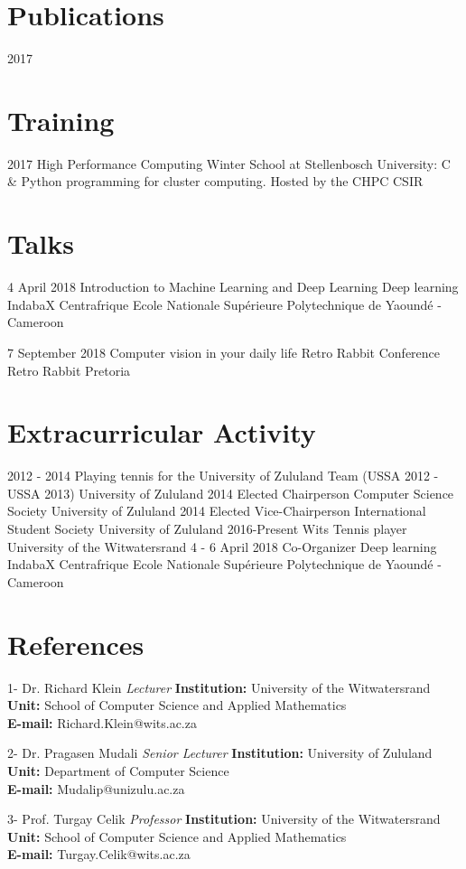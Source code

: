 \documentclass[letterpaper]{moderncv}        %
\begin{document}
	
\section{Publications}
\cventry
{2017}
{}
{}
{}
{}
{}

\section{Training}
\cventry
{2017}
{High Performance Computing Winter School at Stellenbosch University: C \& Python programming for cluster computing.}
{Hosted by the CHPC}
{CSIR}
{}
{}

\section{Talks}
\cventry
{4 April 2018}
{Introduction to Machine Learning and Deep Learning}
{Deep learning IndabaX Centrafrique}
{Ecole Nationale Supérieure Polytechnique de Yaoundé - Cameroon}
{}
{}

\cventry
{7 September 2018}
{Computer vision in your daily life}
{Retro Rabbit Conference}
{Retro Rabbit Pretoria}
{}
{}
	
\section{Extracurricular Activity}
\cventry
{2012 - 2014}
{Playing tennis for the University of Zululand Team (USSA 2012 - USSA 2013)}
{University of Zululand}
{}
{}
{}
\cventry
{2014}
{Elected Chairperson Computer Science Society}
{University of Zululand}
{}
{}
{}
\cventry
{2014}
{Elected Vice-Chairperson International Student Society}
{University of Zululand}
{}
{}
{}	
\cventry
{2016-Present}
{Wits Tennis player}
{University of the Witwatersrand}
{}
{}
{}
\cventry
{4 - 6 April 2018}
{Co-Organizer Deep learning IndabaX Centrafrique}
{Ecole Nationale Supérieure Polytechnique de Yaoundé - Cameroon}
{}
{}
{}

\section{References}
\cventry
{1-}
{Dr. Richard Klein}
{}
{\textit{Lecturer}}
{}
{\textbf{Institution:} University of the Witwatersrand\\
	\textbf{Unit:} School of Computer Science and Applied Mathematics\\
	\textbf{E-mail:} Richard.Klein@wits.ac.za}
\vspace{1mm}

\cventry
{2-}
{Dr. Pragasen Mudali}
{}
{\textit{Senior Lecturer}}
{}
{\textbf{Institution:} University of Zululand\\
	\textbf{Unit:} Department of Computer Science\\
	\textbf{E-mail:} Mudalip@unizulu.ac.za}
\vspace{1mm}

\cventry
{3-}
{Prof. Turgay Celik}
{}
{\textit{Professor}}
{}
{\textbf{Institution:} University of the Witwatersrand\\
	\textbf{Unit:} School of Computer Science and Applied Mathematics\\
	\textbf{E-mail:} Turgay.Celik@wits.ac.za}
\vspace{1mm}
\end{document}
